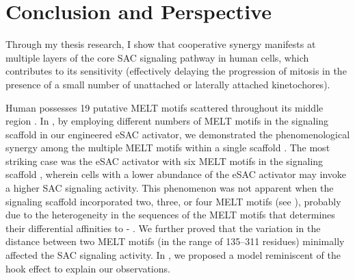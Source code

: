 \chapter{Conclusion and Perspective}
\label{chpt:conclusion}


Through my thesis research, I show that cooperative synergy manifests at multiple layers of the core SAC signaling pathway in human cells, which contributes to its sensitivity (effectively delaying the progression of mitosis in the presence of a small number of unattached or laterally attached kinetochores).

Human  possesses 19 putative MELT motifs scattered throughout its middle region \cite{MELTEvolution}. In , by employing different numbers of MELT motifs in the signaling scaffold in our engineered eSAC activator, we demonstrated the phenomenological synergy among the multiple MELT motifs within a single scaffold \cite{eSAC}. The most striking case was the eSAC activator with six MELT motifs in the signaling scaffold , wherein cells with a lower abundance of the eSAC activator may invoke a higher SAC signaling activity. This phenomenon was not apparent when the signaling scaffold incorporated two, three, or four MELT motifs (see ), probably due to the heterogeneity in the sequences of the MELT motifs that determines their differential affinities to - \cite{MELTActivity, eSAC}. We further proved that the variation in the distance between two MELT motifs (in the range of 135--311 residues) minimally affected the SAC signaling activity. In , we proposed a model reminiscent of the hook effect to explain our observations.

